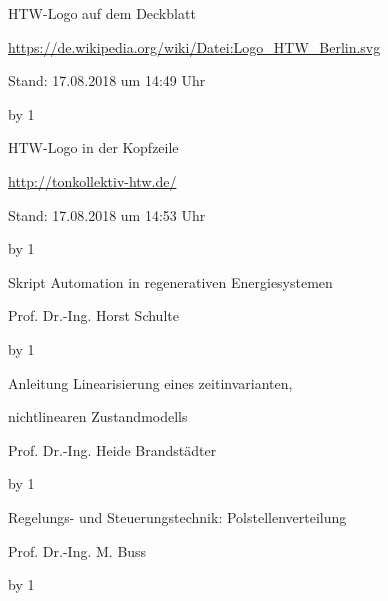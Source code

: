 \documentclass[
	pagesize,
	fontsize=12pt,
	paper=a4,
	oneside,
   reqno
]{scrartcl}
\numberwithin{equation}{section} %
\numberwithin{table}{section} %
\numberwithin{figure}{section} %
\begin{document}











% 

\newpage
\newcount\Quellennummer
{}

\renewcommand\refname{Literaturverzeichnis}

\begin{thebibliography}{999}
{\setlength{\emergencystretch}{3cm}%

HTW-Logo auf dem Deckblatt\par
\url{https://de.wikipedia.org/wiki/Datei:Logo_HTW_Berlin.svg} \par
 Stand: 17.08.2018 um 14:49 Uhr

\advance\Quellennummer by 1
 
HTW-Logo in der Kopfzeile\par
\url{http://tonkollektiv-htw.de/} \par
 Stand: 17.08.2018 um 14:53 Uhr

\advance\Quellennummer by 1

Skript Automation in regenerativen Energiesystemen\par
Prof.\xspace Dr.\xspace -Ing.\xspace Horst Schulte

\advance\Quellennummer by 1

Anleitung Linearisierung eines zeitinvarianten,\par
nichtlinearen Zustandmodells\par
Prof.\xspace Dr.\xspace -Ing.\xspace Heide Brandstädter

\advance\Quellennummer by 1

Regelungs- und Steuerungstechnik: Polstellenverteilung\par
Prof.\xspace Dr.\xspace -Ing.\xspace M. Buss

\advance\Quellennummer by 1

}
\end{thebibliography}
\end{document}
